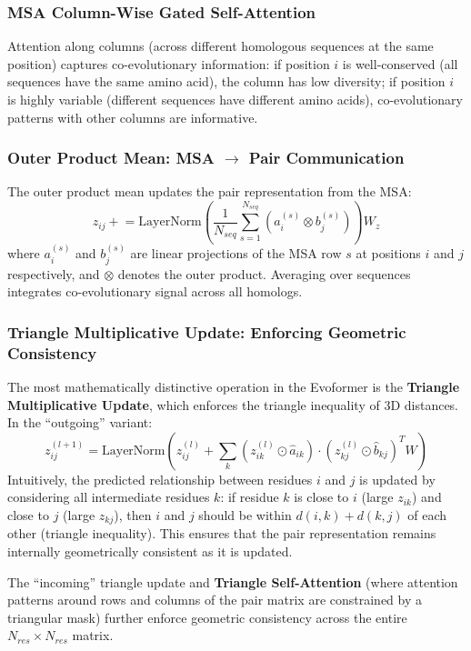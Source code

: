 ﻿\documentclass[12pt,a4paper]{article}
\begin{document}
\subsubsection{MSA Column-Wise Gated Self-Attention}

Attention along columns (across different homologous sequences at the same position) captures co-evolutionary information: if position $i$ is well-conserved (all sequences have the same amino acid), the column has low diversity; if position $i$ is highly variable (different sequences have different amino acids), co-evolutionary patterns with other columns are informative.

\subsubsection{Outer Product Mean: MSA $\to$ Pair Communication}

The outer product mean updates the pair representation from the MSA:
$$z_{ij} \mathrel{+}= \text{LayerNorm}\!\left(\frac{1}{N_{seq}} \sum_{s=1}^{N_{seq}} (a_i^{(s)} \otimes b_j^{(s)})\right) W_z$$
where $a_i^{(s)}$ and $b_j^{(s)}$ are linear projections of the MSA row $s$ at positions $i$ and $j$ respectively, and $\otimes$ denotes the outer product. Averaging over sequences integrates co-evolutionary signal across all homologs.

\subsubsection{Triangle Multiplicative Update: Enforcing Geometric Consistency}

The most mathematically distinctive operation in the Evoformer is the \textbf{Triangle Multiplicative Update}, which enforces the triangle inequality of 3D distances. In the ``outgoing'' variant:
$$z_{ij}^{(l+1)} = \text{LayerNorm}\!\left(z_{ij}^{(l)} + \sum_k \left(z_{ik}^{(l)} \odot \hat{a}_{ik}\right) \cdot \left(z_{kj}^{(l)} \odot \hat{b}_{kj}\right)^T W\right)$$
Intuitively, the predicted relationship between residues $i$ and $j$ is updated by considering all intermediate residues $k$: if residue $k$ is close to $i$ (large $z_{ik}$) and close to $j$ (large $z_{kj}$), then $i$ and $j$ should be within $d(i,k) + d(k,j)$ of each other (triangle inequality). This ensures that the pair representation remains internally geometrically consistent as it is updated.

The ``incoming'' triangle update and \textbf{Triangle Self-Attention} (where attention patterns around rows and columns of the pair matrix are constrained by a triangular mask) further enforce geometric consistency across the entire $N_{res} \times N_{res}$ matrix.
\end{document}
